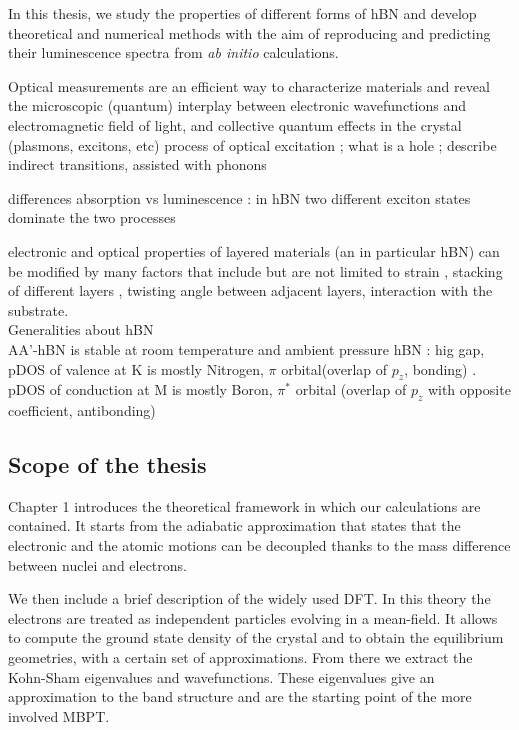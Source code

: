 In this thesis, we study the properties of different forms of hBN and develop theoretical and numerical methods with the aim of reproducing and predicting their luminescence spectra from \textit{ab initio} calculations.


%
Optical measurements are an efficient way to characterize materials and reveal the microscopic (quantum) interplay between electronic wavefunctions and electromagnetic field of light, and collective quantum effects in the crystal (plasmons, excitons, etc)
%
process of optical excitation ; what is a hole ; describe indirect transitions, assisted with phonons

differences absorption vs luminescence : in hBN two different exciton states dominate the two processes
%

electronic and optical properties of layered materials (an in particular hBN) can be modified by many factors that include but are not limited to
strain \cite{blundo2021strain}, stacking of different layers \cite{sponza2018direct}, twisting angle between adjacent layers,\cite{latil2023structural, impellizzeri2022electronic} interaction with the substrate. \\


Generalities about hBN \\
AA'-hBN is stable at room temperature and ambient pressure
hBN : hig gap, pDOS of valence at K is mostly Nitrogen, $\pi$ orbital(overlap of $p_z$, bonding)  . pDOS of conduction at M is mostly Boron, $\pi^*$ orbital (overlap of $p_z$ with opposite coefficient, antibonding)\\


\subsection{Scope of the thesis}
%
Chapter 1 introduces the theoretical framework in which our calculations are contained. It starts from the adiabatic approximation that states that the electronic and the atomic motions can be decoupled thanks to the mass difference between nuclei and electrons.

We then include a brief description of the widely used \acrfull{DFT}. In this theory the electrons are treated as independent particles evolving in a mean-field. It allows to compute the ground state density of the crystal and to obtain the equilibrium geometries, with a certain set of approximations. From there we extract the Kohn-Sham eigenvalues and wavefunctions. These eigenvalues give an approximation to the band structure and are the starting point of the more involved \acrfull{MBPT}. 

